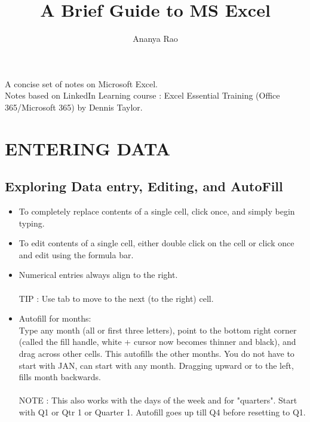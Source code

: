 \documentclass[11pt, oneside]{article}   	%
\title{A Brief Guide to MS Excel}
\author{Ananya Rao}
\begin{document}
\null  %
\nointerlineskip  %
\vfill
\let\snewpage \newpage
\let\newpage \relax
\maketitle
\begin{center}
A concise set of notes on Microsoft Excel. \\
 \bigskip
Notes based on LinkedIn Learning course : Excel Essential Training (Office 365/Microsoft 365) by Dennis Taylor.
\end{center}
\let \newpage \snewpage
\vfill 
\pagebreak
\section {ENTERING DATA} 
\subsection{Exploring Data entry, Editing, and AutoFill}
\begin{itemize}
\item To completely replace contents of a single cell, click once, and simply begin typing. \\
\item To edit contents of a single cell, either double click on the cell or click once and edit using the formula bar. \\
\item Numerical entries always align to the right.\\
\bigskip \\
\indent TIP : Use tab to move to the next (to the right) cell. \\
\item Autofill for months: \\
	Type any month (all or first three letters), point to the bottom right corner (called the fill handle, white + cursor now becomes thinner and black), and drag across other cells. This autofills the other months. You do not have to start with JAN, can start with any month. Dragging upward or to the left, fills month backwards. \\
	\bigskip \\
	\indent NOTE : This also works with the days of the week and for "quarters". Start with Q1 or Qtr 1 or Quarter 1. Autofill goes up till Q4 before resetting to Q1.
\end{itemize}
\end{document}
